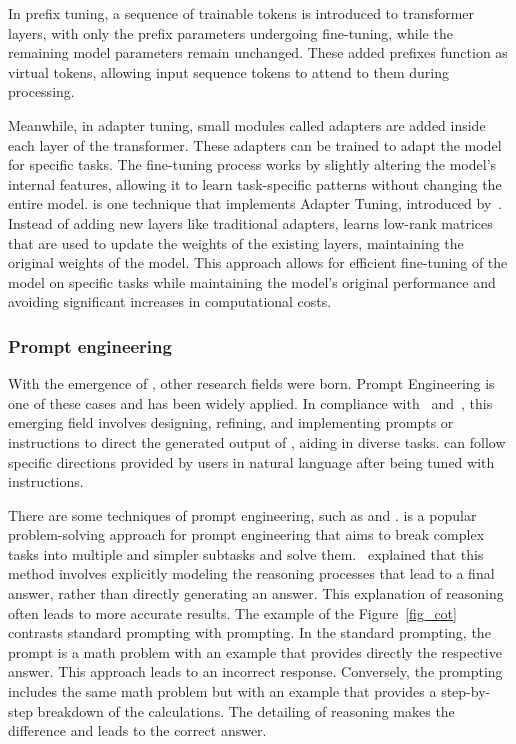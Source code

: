 In prefix tuning, a sequence of trainable tokens is introduced to transformer layers, with only the prefix parameters undergoing fine-tuning, while the remaining model parameters remain unchanged. These added prefixes function as virtual tokens, allowing input sequence tokens to attend to them during processing.

Meanwhile, in adapter tuning, small modules called adapters are added inside each layer of the transformer. These adapters can be trained to adapt the model for specific tasks. The fine-tuning process works by slightly altering the model's internal features, allowing it to learn task-specific patterns without changing the entire model. {\lora} is one technique that implements Adapter Tuning, introduced by~\citet{hu_lora_2021}. Instead of adding new layers like traditional adapters, {\lora} learns low-rank matrices that are used to update the weights of the existing layers, maintaining the original weights of the model. This approach allows for efficient fine-tuning of the model on specific tasks while maintaining the model's original performance and avoiding significant increases in computational costs.


\subsubsection{Prompt engineering}

With the emergence of {\llm}, other research fields were born. Prompt Engineering is one of these cases and has been widely applied. In compliance with~\citet{mesko_prompt_2023} and~\citet{ma_beyond_2023}, this emerging field involves designing, refining, and implementing prompts or instructions to direct the generated output of {\llm}, aiding in diverse tasks. {\llm} can follow specific directions provided by users in natural language after being tuned with instructions.

There are some techniques of prompt engineering, such as {\chain} and {\react}. {\chain} is a popular problem-solving approach for prompt engineering that aims to break complex tasks into multiple and simpler subtasks and solve them.~\citet{wei_chain--thought_2023} explained that this method involves explicitly modeling the reasoning processes that lead to a final answer, rather than directly generating an answer. This explanation of reasoning often leads to more accurate results. The example of the Figure~\ref{fig_cot} contrasts standard prompting with {\chain} prompting. In the standard prompting, the {\llm} prompt is a math problem with an example that provides directly the respective answer. This approach leads to an incorrect response. Conversely, the {\chain} prompting includes the same math problem but with an example that provides a step-by-step breakdown of the calculations. The detailing of reasoning makes the difference and leads to the correct answer.

